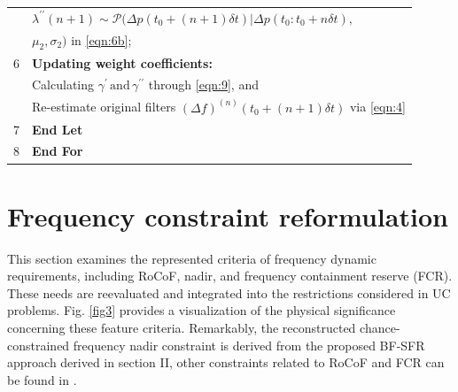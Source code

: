 \documentclass[lettersize,journal]{IEEEtran}
\begin{document}
\begin{table}[!t]
\begin{tabular}{cl}
		    & \qquad  $\lambda^{\prime\prime}(n+1)\sim\mathcal{P}(\varDelta p(t_0\!+\!(n\!+\!1)\delta t)| \varDelta p(t_0:t_0 \!+\! n\delta t),$ \\
		    & \qquad $\mu_2,\sigma_2)$ in \eqref{eqn:6b};                                                                                        \\
		6   & \qquad \textbf{Updating weight coefficients:}                                                                                      \\
		    & \qquad Calculating $\gamma^{\prime}\,\text{and}\, \gamma^{\prime\prime}$ through \eqref{eqn:9}, and                                \\
		    & \qquad Re-estimate original filters $\left(\varDelta f\right)^{(n)}(t_0 \!+ \!(n\!+\!1) \delta t)$ via \eqref{eqn:4}               \\
		7   & \quad \textbf{End Let}                                                                                                             \\
		8   & \textbf{End For}                                                                                                                   \\
		\hline
	\end{tabular}
\end{table}

\vspace{-0.100in}
\section{Frequency constraint reformulation}
\vspace{-0.0250in}

This section examines the represented criteria of frequency dynamic requirements, including RoCoF, nadir, and frequency containment reserve (FCR). These needs are reevaluated and integrated into the restrictions considered in UC problems. Fig. \ref{fig3} provides a visualization of the physical significance concerning these feature criteria. Remarkably, the reconstructed chance-constrained frequency nadir constraint is derived from the proposed BF-SFR approach derived in section II, other constraints related to RoCoF and FCR can be found in \cite{restrepo2005unit, teng2015stochastic, chu2020towards, ding2021two,zhang2020modeling, zhang2021encoding,oskouee2021primary,perroy2019provision,wang2021adaptive}.

\vspace{-0.225in}
\end{document}
